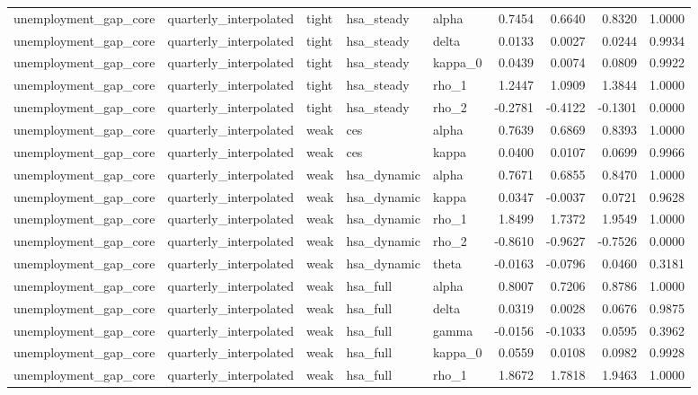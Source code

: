 \begin{tabular}{lllllrrrr}
unemployment\_gap\_core & quarterly\_interpolated & tight & hsa\_steady & alpha & 0.7454 & 0.6640 & 0.8320 & 1.0000 \\
unemployment\_gap\_core & quarterly\_interpolated & tight & hsa\_steady & delta & 0.0133 & 0.0027 & 0.0244 & 0.9934 \\
unemployment\_gap\_core & quarterly\_interpolated & tight & hsa\_steady & kappa\_0 & 0.0439 & 0.0074 & 0.0809 & 0.9922 \\
unemployment\_gap\_core & quarterly\_interpolated & tight & hsa\_steady & rho\_1 & 1.2447 & 1.0909 & 1.3844 & 1.0000 \\
unemployment\_gap\_core & quarterly\_interpolated & tight & hsa\_steady & rho\_2 & -0.2781 & -0.4122 & -0.1301 & 0.0000 \\
unemployment\_gap\_core & quarterly\_interpolated & weak & ces & alpha & 0.7639 & 0.6869 & 0.8393 & 1.0000 \\
unemployment\_gap\_core & quarterly\_interpolated & weak & ces & kappa & 0.0400 & 0.0107 & 0.0699 & 0.9966 \\
unemployment\_gap\_core & quarterly\_interpolated & weak & hsa\_dynamic & alpha & 0.7671 & 0.6855 & 0.8470 & 1.0000 \\
unemployment\_gap\_core & quarterly\_interpolated & weak & hsa\_dynamic & kappa & 0.0347 & -0.0037 & 0.0721 & 0.9628 \\
unemployment\_gap\_core & quarterly\_interpolated & weak & hsa\_dynamic & rho\_1 & 1.8499 & 1.7372 & 1.9549 & 1.0000 \\
unemployment\_gap\_core & quarterly\_interpolated & weak & hsa\_dynamic & rho\_2 & -0.8610 & -0.9627 & -0.7526 & 0.0000 \\
unemployment\_gap\_core & quarterly\_interpolated & weak & hsa\_dynamic & theta & -0.0163 & -0.0796 & 0.0460 & 0.3181 \\
unemployment\_gap\_core & quarterly\_interpolated & weak & hsa\_full & alpha & 0.8007 & 0.7206 & 0.8786 & 1.0000 \\
unemployment\_gap\_core & quarterly\_interpolated & weak & hsa\_full & delta & 0.0319 & 0.0028 & 0.0676 & 0.9875 \\
unemployment\_gap\_core & quarterly\_interpolated & weak & hsa\_full & gamma & -0.0156 & -0.1033 & 0.0595 & 0.3962 \\
unemployment\_gap\_core & quarterly\_interpolated & weak & hsa\_full & kappa\_0 & 0.0559 & 0.0108 & 0.0982 & 0.9928 \\
unemployment\_gap\_core & quarterly\_interpolated & weak & hsa\_full & rho\_1 & 1.8672 & 1.7818 & 1.9463 & 1.0000 \\

\end{tabular}
